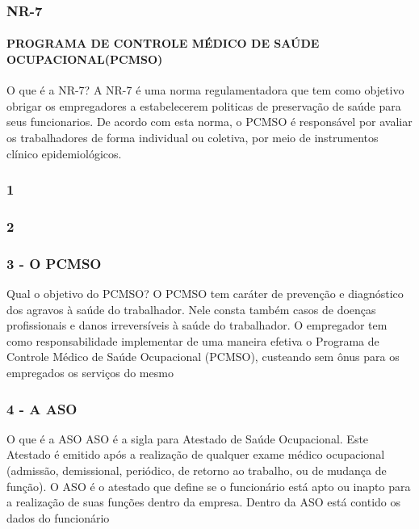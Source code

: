 \documentclass{beamer}
\begin{document}
\begin{frame}
\frametitle{NR-7}
\framesubtitle{PROGRAMA DE CONTROLE MÉDICO DE SAÚDE OCUPACIONAL(PCMSO)}


\begin{block}{O que é a NR-7?}
A NR-7 é uma norma regulamentadora que tem como objetivo obrigar os empregadores
a estabelecerem politicas de preservação de saúde para seus funcionarios. De acordo com esta norma, o PCMSO é responsável por avaliar os trabalhadores de forma individual ou coletiva, por meio de instrumentos clínico epidemiológicos.
\end{block}
\end{frame}

\begin{frame}
\frametitle{1}
\end{frame}

\begin{frame}
\frametitle{2}
\end{frame}

\begin{frame}
\frametitle{3 - O PCMSO}
\begin{block}{Qual o objetivo do PCMSO?}
O PCMSO tem caráter de prevenção e diagnóstico dos agravos à saúde do 
trabalhador. Nele consta também casos de doenças profissionais e danos 
irreversíveis à saúde do trabalhador.
O empregador tem como responsabilidade implementar de uma maneira efetiva o 
Programa de Controle Médico de Saúde Ocupacional (PCMSO), custeando sem ônus 
para os empregados os serviços do mesmo
\end{block}
\end{frame}

\begin{frame}
\frametitle{4 - A ASO}
\begin{block}{O que é a ASO}
ASO é a sigla para Atestado de Saúde Ocupacional. Este Atestado é emitido após 
a realização de qualquer exame médico ocupacional (admissão, demissional, 
periódico, de retorno ao trabalho, ou de mudança de função). O ASO é o atestado 
que define se o funcionário está apto ou inapto para a realização de suas 
funções dentro da empresa. Dentro da ASO está contido os dados do funcionário
\end{block}
\end{frame}
\end{document}
